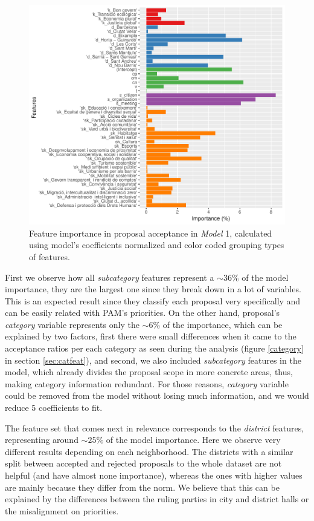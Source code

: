 \begin{figure}[t]
\centering
\includegraphics[width=\textwidth]{Figures/importances.pdf}
\caption{Feature importance in proposal acceptance in \emph{Model} 1, calculated using model's coefficients normalized and color coded grouping types of features.}
\label{importance}
\end{figure}

First we observe how all \emph{subcategory} features represent a $\sim 36\%$ of the model importance, they are the largest one since they break down in a lot of variables. This is an expected result since they classify each proposal very specifically and can be easily related with PAM's priorities. On the other hand, proposal's \emph{category} variable represents only the $\sim 6\%$  of the importance, which can be explained by two factors, first there were small differences when it came to the acceptance ratios per each category as seen during the analysis (figure \ref{category} in section \ref{sec:catfeat}), and second, we also included \emph{subcategory} features in the model, which already divides the proposal scope in more concrete areas, thus, making category information redundant. For those reasons, \emph{category} variable could be removed from the model without losing much information, and we would reduce 5 coefficients to fit. 

The feature set that comes next in relevance corresponds to the \emph{district} features, representing around $\sim 25\%$ of the model importance. Here we observe very different results depending on each neighborhood. The districts with a similar split between accepted and rejected proposals to the whole dataset are not helpful (and have almost none importance), whereas the ones with higher values are mainly because they differ from the norm. We believe that this can be explained by the differences between the ruling parties in city and district halls or the misalignment on priorities.

